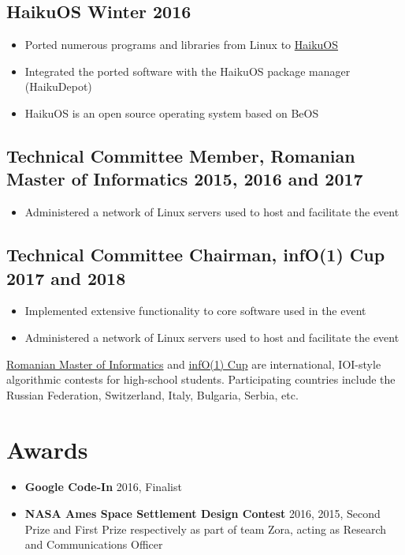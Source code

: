 \documentclass[a4paper]{article}
\begin{document}
\subsection*{HaikuOS \hfill Winter 2016}
\begin{itemize}
\item Ported numerous programs and libraries from Linux to
  \href{https://www.haiku-os.org/}{HaikuOS}
	\item Integrated the ported software with the HaikuOS package manager
		(HaikuDepot)
  \item HaikuOS is an open source operating system based on BeOS
\end{itemize}

\subsection*{Technical Committee Member, Romanian Master of Informatics \hfill
2015, 2016 and 2017}
\begin{itemize}
	\item Administered a network of Linux servers used to host and facilitate
		the event
\end{itemize}

\subsection*{Technical Committee Chairman, infO(1) Cup \hfill 2017 and 2018}
\begin{itemize}
	\item Implemented extensive functionality to core software used in the event
	\item Administered a network of Linux servers used to host and facilitate
		the event
\end{itemize}

\vspace{5pt}
\href{http://rmi.lbi.ro}{Romanian Master of Informatics} and \href{http://info1cup.com/}{infO(1) Cup} are international, IOI-style
algorithmic contests for high-school students. Participating countries include
the Russian Federation, Switzerland, Italy, Bulgaria, Serbia, etc.

\section*{Awards}

\begin{itemize}
	\item \textbf{Google Code-In} 2016, Finalist
	\item \textbf{NASA Ames Space Settlement Design Contest} 2016, 2015, Second Prize and First
		Prize respectively as part of team Zora, acting as Research and
		Communications Officer
\end{itemize}
\end{document}

